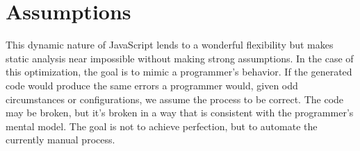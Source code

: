 \section{Assumptions}

This dynamic nature of JavaScript lends to a wonderful flexibility but makes static analysis near impossible without making strong assumptions.  In the case of this optimization, the goal is to mimic a programmer's behavior.  If the generated code would produce the same errors a programmer would, given odd circumstances or configurations, we assume the process to be correct.  The code may be broken, but it's broken in a way that is consistent with the programmer's mental model.  The goal is not to achieve perfection, but to automate the currently manual process.  



